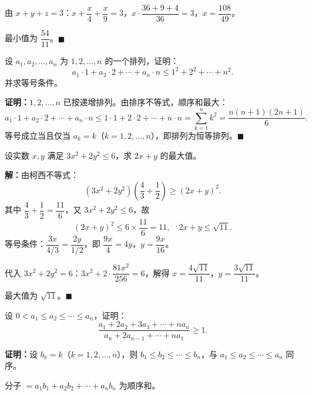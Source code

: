 \documentclass[12pt, a4paper]{ctexart}
\begin{document}
由 $x + y + z = 3$：$x + \dfrac{x}{4} + \dfrac{x}{9} = 3$，$x \cdot \dfrac{36 + 9 + 4}{36} = 3$，$x = \dfrac{108}{49}$。

最小值为 $\boxed{\dfrac{54}{11}}$。\hfill $\blacksquare$

\begin{examplebox}[【例题8】排序不等式证明排序乘积最大]
设 $a_1, a_2, \ldots, a_n$ 为 $1, 2, \ldots, n$ 的一个排列，证明：
\[
  a_1 \cdot 1 + a_2 \cdot 2 + \cdots + a_n \cdot n \leqslant 1^2 + 2^2 + \cdots + n^2.
\]
并求等号条件。
\end{examplebox}

\textbf{证明：}$1, 2, \ldots, n$ 已按递增排列。由排序不等式，顺序和最大：
\[
  a_1 \cdot 1 + a_2 \cdot 2 + \cdots + a_n \cdot n \leqslant 1 \cdot 1 + 2 \cdot 2 + \cdots + n \cdot n = \sum_{k=1}^n k^2 = \frac{n(n+1)(2n+1)}{6}.
\]
等号成立当且仅当 $a_k = k$（$k = 1, 2, \ldots, n$），即排列为恒等排列。\hfill $\blacksquare$

\begin{examplebox}[【例题9】柯西不等式与方程结合]
设实数 $x, y$ 满足 $3x^2 + 2y^2 \leqslant 6$，求 $2x + y$ 的最大值。
\end{examplebox}

\textbf{解：}由柯西不等式：
\[
  (3x^2 + 2y^2)\!\left(\frac{4}{3} + \frac{1}{2}\right) \geqslant (2x + y)^2.
\]
其中 $\dfrac{4}{3} + \dfrac{1}{2} = \dfrac{11}{6}$，又 $3x^2 + 2y^2 \leqslant 6$，故
\[
  (2x + y)^2 \leqslant 6 \times \frac{11}{6} = 11, \quad 2x + y \leqslant \sqrt{11}.
\]
等号条件：$\dfrac{3x}{4/3} = \dfrac{2y}{1/2}$，即 $\dfrac{9x}{4} = 4y$，$y = \dfrac{9x}{16}$。

代入 $3x^2 + 2y^2 = 6$：$3x^2 + 2 \cdot \dfrac{81x^2}{256} = 6$，解得 $x = \dfrac{4\sqrt{11}}{11}$，$y = \dfrac{3\sqrt{11}}{11}$。

最大值为 $\boxed{\sqrt{11}}$。\hfill $\blacksquare$

\begin{examplebox}[【例题10】切比雪夫不等式应用]
设 $0 < a_1 \leqslant a_2 \leqslant \cdots \leqslant a_n$，证明：
\[
  \frac{a_1 + 2a_2 + 3a_3 + \cdots + n a_n}{a_n + 2a_{n-1} + \cdots + n a_1} \geqslant 1.
\]
\end{examplebox}

\textbf{证明：}设 $b_k = k$（$k=1,2,\ldots,n$），则 $b_1 \leqslant b_2 \leqslant \cdots \leqslant b_n$，与 $a_1 \leqslant a_2 \leqslant \cdots \leqslant a_n$ 同序。

分子 $= a_1 b_1 + a_2 b_2 + \cdots + a_n b_n$ 为顺序和。
\end{document}
